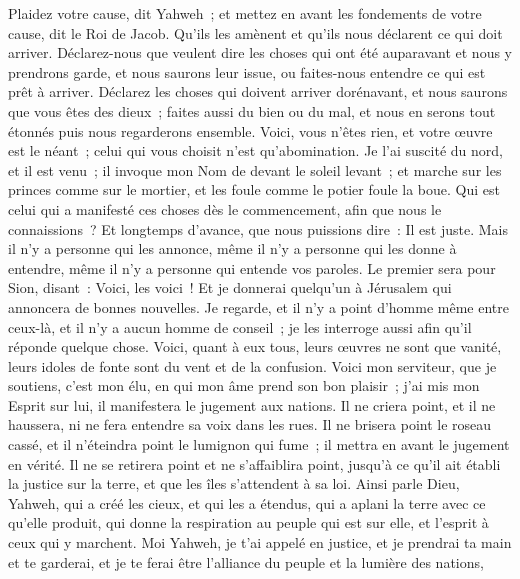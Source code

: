 \begin{multicols}{2}
Plaidez votre cause, dit Yahweh~; et mettez en avant les fondements de votre cause, dit le Roi de Jacob.
Qu'ils les amènent et qu'ils nous déclarent ce qui doit arriver. Déclarez-nous que veulent dire les choses qui ont été auparavant et nous y prendrons garde, et nous saurons leur issue, ou faites-nous entendre ce qui est prêt à arriver. 
Déclarez les choses qui doivent arriver dorénavant, et nous saurons que vous êtes des dieux~; faites aussi du bien ou du mal, et nous en serons tout étonnés puis nous regarderons ensemble.
Voici, vous n'êtes rien, et votre œuvre est le néant~; celui qui vous choisit n'est qu'abomination.
Je l'ai suscité du nord, et il est venu~; il invoque mon Nom de devant le soleil levant~; et marche sur les princes comme sur le mortier, et les foule comme le potier foule la boue.
Qui est celui qui a manifesté ces choses dès le commencement, afin que nous le connaissions~? Et longtemps d'avance, que nous puissions dire~: Il est juste. Mais il n'y a personne qui les annonce, même il n'y a personne qui les donne à entendre, même il n'y a personne qui entende vos paroles.
Le premier sera pour Sion, disant~: Voici, les voici~! Et je donnerai quelqu'un à Jérusalem qui annoncera de bonnes nouvelles.
Je regarde, et il n'y a point d'homme même entre ceux-là, et il n'y a aucun homme de conseil~; je les interroge aussi afin qu'il réponde quelque chose. 
Voici, quant à eux tous, leurs œuvres ne sont que vanité, leurs idoles de fonte sont du vent et de la confusion.
\VerseOne{}Voici mon serviteur, que je soutiens, c'est mon élu, en qui mon âme prend son bon plaisir~; j'ai mis mon Esprit sur lui, il manifestera le jugement aux nations.
Il ne criera point, et il ne haussera, ni ne fera entendre sa voix dans les rues.
Il ne brisera point le roseau cassé, et il n'éteindra point le lumignon qui fume~; il mettra en avant le jugement en vérité.
Il ne se retirera point et ne s'affaiblira point, jusqu'à ce qu'il ait établi la justice sur la terre, et que les îles s'attendent à sa loi.
Ainsi parle Dieu, Yahweh, qui a créé les cieux, et qui les a étendus, qui a aplani la terre avec ce qu'elle produit, qui donne la respiration au peuple qui est sur elle, et l'esprit à ceux qui y marchent.
Moi Yahweh, je t'ai appelé en justice, et je prendrai ta main et te garderai, et je te ferai être l'alliance du peuple et la lumière des nations,

\end{multicols}
